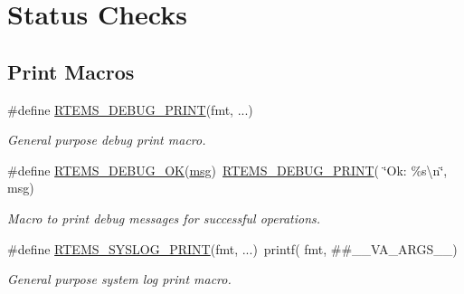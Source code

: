 \hypertarget{group__rtems__status__checks}{}\section{Status Checks}
\label{group__rtems__status__checks}
\subsection*{Print Macros}
\begin{DoxyCompactItemize}
\item 
\mbox{\label{group__rtems__status__checks_ga6547588daa5fbd983b3c395d97f81db7}} 
\#define \mbox{\hyperlink{group__rtems__status__checks_ga6547588daa5fbd983b3c395d97f81db7}{R\+T\+E\+M\+S\+\_\+\+D\+E\+B\+U\+G\+\_\+\+P\+R\+I\+NT}}(fmt, ...)
\begin{DoxyCompactList}\small\item\em General purpose debug print macro. \end{DoxyCompactList}\item 
\mbox{\label{group__rtems__status__checks_ga1f4955118d6ae4aa4839c970bbcca2d6}} 
\#define \mbox{\hyperlink{group__rtems__status__checks_ga1f4955118d6ae4aa4839c970bbcca2d6}{R\+T\+E\+M\+S\+\_\+\+D\+E\+B\+U\+G\+\_\+\+OK}}(\mbox{\hyperlink{structmsg}{msg}})~\mbox{\hyperlink{group__rtems__status__checks_ga6547588daa5fbd983b3c395d97f81db7}{R\+T\+E\+M\+S\+\_\+\+D\+E\+B\+U\+G\+\_\+\+P\+R\+I\+NT}}( \char`\"{}Ok\+: \%s\textbackslash{}n\char`\"{}, msg)
\begin{DoxyCompactList}\small\item\em Macro to print debug messages for successful operations. \end{DoxyCompactList}\item 
\mbox{\label{group__rtems__status__checks_gae6366e5dd71c9ba9d8cd7d3688b2f6ef}} 
\#define \mbox{\hyperlink{group__rtems__status__checks_gae6366e5dd71c9ba9d8cd7d3688b2f6ef}{R\+T\+E\+M\+S\+\_\+\+S\+Y\+S\+L\+O\+G\+\_\+\+P\+R\+I\+NT}}(fmt, ...)~printf( fmt, \#\#\+\_\+\+\_\+\+V\+A\+\_\+\+A\+R\+G\+S\+\_\+\+\_\+)
\begin{DoxyCompactList}\small\item\em General purpose system log print macro. \end{DoxyCompactList}\item 

\end{DoxyCompactItemize}
